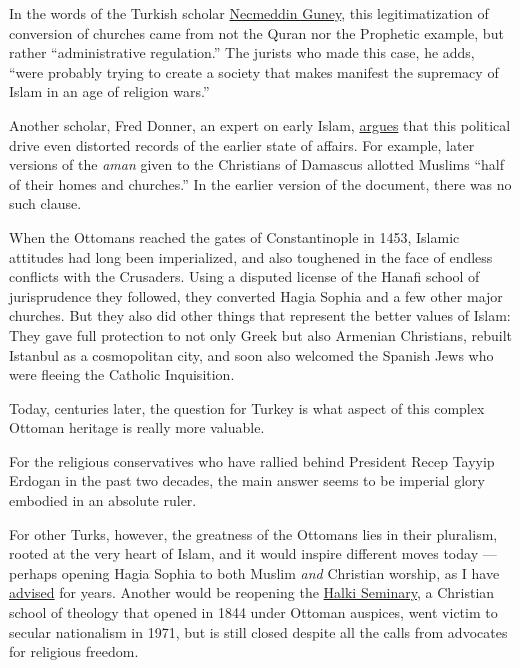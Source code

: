 In the words of the Turkish scholar
\href{https://www.academia.edu/8126217/_Churches_and_Synagogues_in_Classical_Islamic_Law_Debates_on_Construction_Continuance_and_Repair_International_Conference_on_Religious_Tourism_and_Tolerance_9-12_May_2013_Konya_pp._353-360}{Necmeddin
Guney}, this legitimatization of conversion of churches came from not
the Quran nor the Prophetic example, but rather ``administrative
regulation.'' The jurists who made this case, he adds, ``were probably
trying to create a society that makes manifest the supremacy of Islam in
an age of religion wars.''

Another scholar, Fred Donner, an expert on early Islam,
\href{https://www.amazon.com/dp/1597404586/ref=dp-kindle-redirect?_encoding=UTF8\&btkr=1}{argues}
that this political drive even distorted records of the earlier state of
affairs. For example, later versions of the \emph{aman} given to the
Christians of Damascus allotted Muslims ``half of their homes and
churches.'' In the earlier version of the document, there was no such
clause.

When the Ottomans reached the gates of Constantinople in 1453, Islamic
attitudes had long been imperialized, and also toughened in the face of
endless conflicts with the Crusaders. Using a disputed license of the
Hanafi school of jurisprudence they followed, they converted Hagia
Sophia and a few other major churches. But they also did other things
that represent the better values of Islam: They gave full protection to
not only Greek but also Armenian Christians, rebuilt Istanbul as a
cosmopolitan city, and soon also welcomed the Spanish Jews who were
fleeing the Catholic Inquisition.

Today, centuries later, the question for Turkey is what aspect of this
complex Ottoman heritage is really more valuable.

For the religious conservatives who have rallied behind President Recep
Tayyip Erdogan in the past two decades, the main answer seems to be
imperial glory embodied in an absolute ruler.

For other Turks, however, the greatness of the Ottomans lies in their
pluralism, rooted at the very heart of Islam, and it would inspire
different moves today --- perhaps opening Hagia Sophia to both Muslim
\emph{and} Christian worship, as I have
\href{https://www.hurriyetdailynews.com/opinion/mustafa-akyol/hagia-sophia-could-be-a-mosquechurch-66074}{advised}
for years. Another would be reopening the
\href{https://www.nytimes3xbfgragh.onion/2019/02/06/world/europe/greece-tsipras-halki-seminary.html}{Halki
Seminary}, a Christian school of theology that opened in 1844 under
Ottoman auspices, went victim to secular nationalism in 1971, but is
still closed despite all the calls from advocates for religious freedom.

